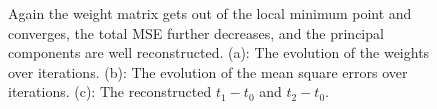 \begin{figure}
\centering
{}
\caption{Again the weight matrix gets out of the local minimum point and converges,
the total MSE further decreases, and the principal components are well reconstructed.
(a): The evolution of the weights over iterations.
(b): The evolution of the mean square errors over iterations.
(c): The reconstructed $t_1-t_0$ and $t_2-t_0$.}
\label{global_best}
\end{figure}

